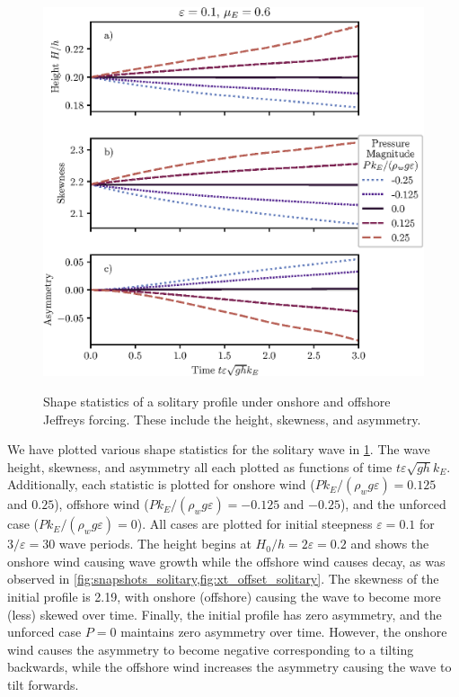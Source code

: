 \documentclass{jfm}
\renewcommand*{\epsilon}{\varepsilon}
\begin{document}
\begin{figure}
  \centering
  { %
    \label{fig:statistics_solitary:a}
    \label{fig:statistics_solitary:b}
    \label{fig:statistics_solitary:c}
  }
  \includegraphics{Skew-Asymm-No-Peak.eps}
  \caption{
    Shape statistics of a solitary profile under onshore and offshore
    Jeffreys forcing.
    These include the
    height,
    skewness, and
    asymmetry.
  }
  \label{fig:statistics_solitary}
\end{figure}

We have plotted various shape statistics for the solitary wave in
\cref{fig:statistics_solitary}.
The  wave height,
 skewness, and
 asymmetry all each plotted as
functions of time $t \epsilon \sqrt{g h} k_E$.
Additionally, each statistic is plotted for onshore wind ($P
k_E/(\rho_w g \epsilon) = 0.125$ and $0.25$), offshore wind ($P
k_E/(\rho_w g \epsilon) = -0.125$ and $-0.25$), and the unforced case
($P k_E/(\rho_w g \epsilon) = 0$).
All cases are plotted for initial steepness $\epsilon = 0.1$ for
$3/\epsilon = 30$ wave periods.
The height  begins at $H_0/h = 2
\epsilon = 0.2$ and shows the onshore wind
causing wave growth while the offshore wind causes decay, as was
observed in \cref{fig:snapshots_solitary,fig:xt_offset_solitary}.
The skewness of the initial profile is \num{2.19}, with onshore
(offshore) causing the wave to become more (less) skewed over time.
Finally, the initial profile has zero asymmetry, and the unforced case
$P=0$ maintains zero asymmetry over time.
However, the onshore wind causes the asymmetry to become negative
corresponding to a tilting backwards, while the offshore wind increases
the asymmetry causing the wave to tilt forwards.
\end{document}
